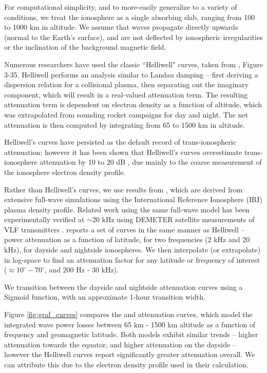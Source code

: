 For computational simplicity, and to more-easily generalize to a variety of conditions, we treat the ionosphere as a single absorbing slab, ranging from 100 to 1000 km in altitude. We assume that waves propagate directly upwards (normal to the Earth's surface), and are not deflected by ionospheric irregularities or the inclination of the background magnetic field.

Numerous researchers \citep{Lauben1998, Bortnik2005, Kulkarni2009, Graf2013} have used the classic ``Helliwell" curves, taken from \cite{Helliwell1965}, Figure 3-35. Helliwell performs an analysis similar to Landau damping -- first deriving a dispersion relation for a collisional plasma, then separating out the imaginary component, which will result in a real-valued attenuation term. The resulting attenuation term is dependent on electron density as a function of altitude, which was extrapolated from sounding rocket campaigns for day and night. The net attenuation is then computed by integrating from 65 to 1500 km in altitude.

Helliwell's curves have persisted as the default record of trans-ionospheric attenuation; however it has been shown that Helliwell's curves overestimate trans-ionosphere attenuation by 10 to 20 dB \citep{Starks2008}, due mainly to the coarse measurement of the ionosphere electron density profile.

Rather than Helliwell's curves, we use results from \cite{Graf2013}, which are derived from extensive full-wave simulations using the International Reference Ionosphere (IRI) plasma density profile. Related work using the same full-wave model has been experimentally verified at $\sim$20 kHz using DEMETER satellite measurements of VLF transmitters \citep{Cohen2012}. \citeauthor{Graf2013} reports a set of curves in the same manner as Helliwell -- power attenuation as a function of latitude, for two frequencies (2 kHz and 20 kHz), for dayside and nightside ionospheres. We then interpolate (or extrapolate) in log-space to find an attenuation factor for any latitude or frequency of interest ($\approx 10^\circ - 70^\circ$, and 200 Hz - 30 kHz).

We transition between the dayside and nightside attenuation curves using a Sigmoid function, with an approximate 1-hour transition width.

Figure \ref{fig:graf_curves} compares the \cite{Graf2013} and \cite{Helliwell1965} attenuation curves, which model the integrated wave power losses between 65 km - 1500 km altitude as a function of frequency and geomagnetic latitude. Both models exhibit similar trends -- higher attenuation towards the equator, and higher attenuation on the dayside -- however the Helliwell curves report significantly greater attenuation overall. We can attribute this due to the electron density profile used in their calculation.

